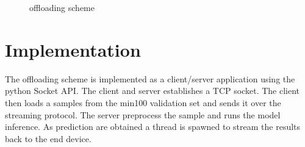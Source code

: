 \begin{figure}
	\captionsetup[subfigure]{justification=centering}
	\hfill
	\caption[Offloading scheme]{offloading scheme}
	\label{fig:offloading-scheme}
\end{figure} 

\section{Implementation}

The offloading scheme is implemented as a client/server application using the \gls{python} Socket API. The client and server establishes a TCP socket. The client then loads a samples from the \gls{min100} validation set and sends it over the streaming protocol. The server preprocess the sample and runs the model inference. As prediction are obtained a thread is spawned to stream the results back to the end device. 

